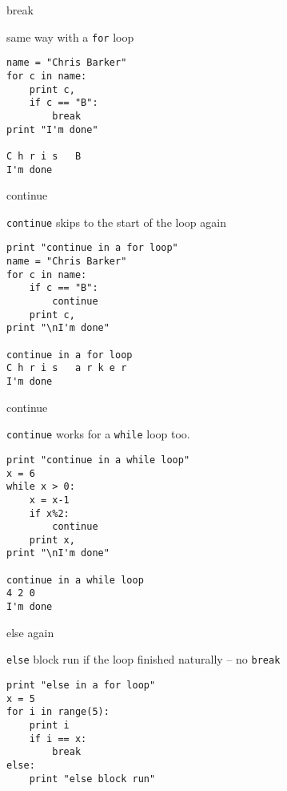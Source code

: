 \documentclass{beamer}
\begin{document}
\begin{frame}[fragile]{break}

{\Large same way with a \verb|for| loop }

\begin{verbatim}
name = "Chris Barker"
for c in name:
    print c,
    if c == "B":
        break
print "I'm done"

C h r i s   B 
I'm done
\end{verbatim}
\end{frame}

\begin{frame}[fragile]{continue}

{\Large \verb|continue| skips to the start of the loop again}

\begin{verbatim}
print "continue in a for loop"
name = "Chris Barker"
for c in name:
    if c == "B":
        continue
    print c,
print "\nI'm done"

continue in a for loop
C h r i s   a r k e r 
I'm done
\end{verbatim}
\end{frame}

\begin{frame}[fragile]{continue}

{\Large \verb|continue| works for a \verb|while| loop too.}

\begin{verbatim}
print "continue in a while loop"
x = 6
while x > 0:
    x = x-1
    if x%2:
        continue
    print x,
print "\nI'm done"

continue in a while loop
4 2 0 
I'm done
\end{verbatim}
\end{frame}

\begin{frame}[fragile]{else again}

{\Large \verb|else| block run if the loop finished naturally -- no \verb|break|}

\begin{verbatim}
print "else in a for loop"
x = 5
for i in range(5):
    print i
    if i == x:
        break
else:
    print "else block run"

\end{verbatim}
\end{frame}
\end{document}
